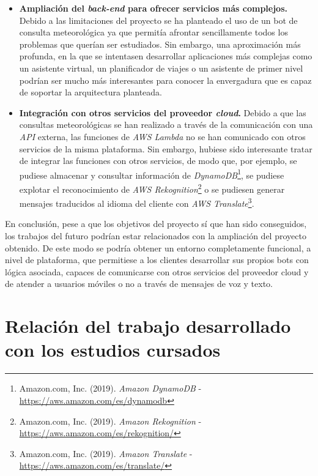 \documentclass[11pt,spanish,listoffigures]{tfgetsinf}
\begin{document}
\begin{itemize}
\item \textbf{Ampliación del \textit{back-end} para ofrecer servicios más complejos.} Debido a las limitaciones del proyecto se ha planteado el uso de un bot de consulta meteorológica ya que permitía afrontar sencillamente todos los problemas que querían ser estudiados. Sin embargo, una aproximación más profunda, en la que se intentasen desarrollar aplicaciones más complejas como un asistente virtual, un planificador de viajes o un asistente de primer nivel podrían ser mucho más interesantes para conocer la envergadura que es capaz de soportar la arquitectura planteada. 

\item \textbf{Integración con otros servicios del proveedor \textit{cloud}.} Debido a que las consultas meteorológicas se han realizado a través de la comunicación con una \textit{API} externa, las funciones de \textit{AWS Lambda} no se han comunicado con otros servicios de la misma plataforma. Sin embargo, hubiese sido interesante tratar de integrar las funciones con otros servicios, de modo que, por ejemplo, se pudiese almacenar y consultar información de \textit{DynamoDB}\footnote{Amazon.com, Inc. (2019). \textit{Amazon DynamoDB} - \url{https://aws.amazon.com/es/dynamodb}}, se pudiese explotar el reconocimiento de \textit{AWS Rekognition}\footnote{Amazon.com, Inc. (2019). \textit{Amazon Rekognition} - \url{https://aws.amazon.com/es/rekognition/}} o se pudiesen generar mensajes traducidos al idioma del cliente con \textit{AWS Translate}\footnote{Amazon.com, Inc. (2019). \textit{Amazon Translate} - \url{https://aws.amazon.com/es/translate/}}.

\end{itemize}

En conclusión, pese a que los objetivos del proyecto sí que han sido conseguidos, los trabajos del futuro podrían estar relacionados con la ampliación del proyecto obtenido. De este modo se podría obtener un entorno completamente funcional, a nivel de plataforma, que permitiese a los clientes desarrollar sus propios bots con lógica asociada, capaces de comunicarse con otros servicios del proveedor cloud y de atender a usuarios móviles o no a través de mensajes de voz y texto.


\section{Relación del trabajo desarrollado con los estudios cursados}
\label{sec:relacion-estudios}
\end{document}
